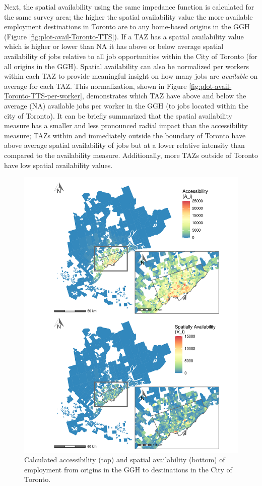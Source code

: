 \documentclass[]{elsarticle} %
\begin{document}
Next, the spatial availability using the same impedance function is
calculated for the same survey area; the higher the spatial availability
value the more available employment destinations in Toronto are to any
home-based origins in the GGH (Figure \ref{fig:plot-avail-Toronto-TTS}).
If a TAZ has a spatial availability value which is higher or lower than
NA it has above or below average spatial availability of jobs relative
to all job opportunities within the City of Toronto (for all origins in
the GGH). Spatial availability can also be normalized per workers within
each TAZ to provide meaningful insight on how many jobs are
\emph{available} on average for each TAZ. This normalization, shown in
Figure \ref{fig:plot-avail-Toronto-TTS-per-worker}, demonstrates which
TAZ have above and below the average (NA) available jobs per worker in
the GGH (to jobs located within the city of Toronto). It can be briefly
summarized that the spatial availability measure has a smaller and less
pronounced radial impact than the accessibility measure; TAZs within and
immediately outside the boundary of Toronto have above average spatial
availability of jobs but at a lower relative intensity than compared to
the availability measure. Additionally, more TAZs outside of Toronto
have low spatial availability values.

\begin{figure}
\includegraphics[width=1\linewidth]{Spatial-Availability_files/figure-latex/plot-access-SA-Toronto-TTS-1} \caption{\label{fig:plot-access-SA-Toronto-TTS}Calculated accessibility (top) and spatial availability (bottom) of employment from origins in the GGH to destinations in the City of Toronto.}\label{fig:plot-access-SA-Toronto-TTS}
\end{figure}
\end{document}
